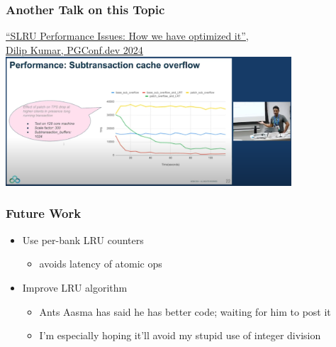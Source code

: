\begin{frame}
  \frametitle{Another Talk on this Topic}
\noindent  \href{https://www.pgevents.ca/events/pgconfdev2024/schedule/session/53-problem-in-postgresql-slru-and-how-we-are-optimizing-it/}
  {``SLRU Performance Issues: How we have optimized it'',\\
  Dilip Kumar, PGConf.dev 2024 \faExternalLink}
  \center \includegraphics[width=0.8\textwidth]{dilip.png}
\end{frame}

\begin{frame}
  \frametitle{Future Work}
  \begin{itemize}
    \item Use per-bank LRU counters
      \begin{itemize}
	\item avoids latency of atomic ops
      \end{itemize}
    \item Improve LRU algorithm
      \begin{itemize}
	\item Ants Aasma has said he has better code; waiting for him to post it
	\item I'm especially hoping it'll avoid my stupid use of integer division
      \end{itemize}
  \end{itemize}
\end{frame}
